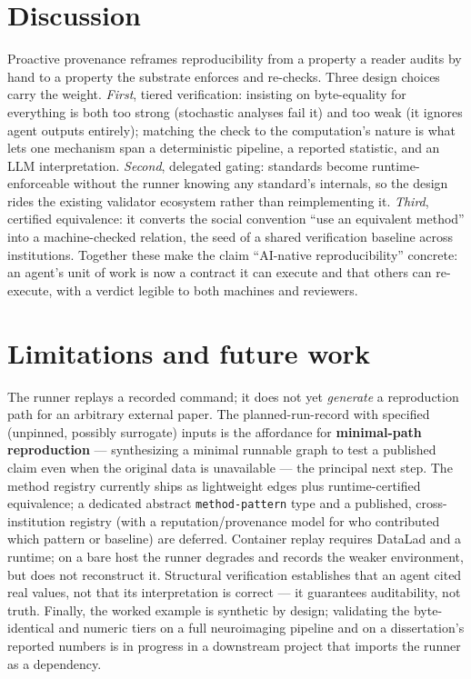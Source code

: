 \documentclass[preprint]{glimmer-paper}
\newcommand{\code}[1]{\texttt{#1}}
\begin{document}
\section{Discussion}
Proactive provenance reframes reproducibility from a property a reader audits by hand to a
property the substrate enforces and re-checks. Three design choices carry the weight.
\emph{First}, tiered verification: insisting on byte-equality for everything is both too
strong (stochastic analyses fail it) and too weak (it ignores agent outputs entirely);
matching the check to the computation's nature is what lets one mechanism span a deterministic
pipeline, a reported statistic, and an LLM interpretation. \emph{Second}, delegated gating:
standards become runtime-enforceable without the runner knowing any standard's internals, so
the design rides the existing validator ecosystem rather than reimplementing it.
\emph{Third}, certified equivalence: it converts the social convention ``use an equivalent
method'' into a machine-checked relation, the seed of a shared verification baseline across
institutions. Together these make the claim ``AI-native reproducibility'' concrete: an
agent's unit of work is now a contract it can execute and that others can re-execute, with a
verdict legible to both machines and reviewers.

\section{Limitations and future work}
\label{sec:future}
The runner replays a recorded command; it does not yet \emph{generate} a reproduction path
for an arbitrary external paper. The planned-run-record with specified (unpinned, possibly
surrogate) inputs is the affordance for \textbf{minimal-path reproduction} --- synthesizing a
minimal runnable graph to test a published claim even when the original data is unavailable
--- the principal next step. The method registry currently ships as lightweight edges plus
runtime-certified equivalence; a dedicated abstract \code{method-pattern} type and a
published, cross-institution registry (with a reputation/provenance model for who contributed
which pattern or baseline) are deferred. Container replay requires DataLad and a runtime; on a
bare host the runner degrades and records the weaker environment, but does not reconstruct it.
Structural verification establishes that an agent cited real values, not that its
interpretation is correct --- it guarantees auditability, not truth. Finally, the worked
example is synthetic by design; validating the byte-identical and numeric tiers on a full
neuroimaging pipeline and on a dissertation's reported numbers is in progress in a downstream
project that imports the runner as a dependency.
\end{document}
